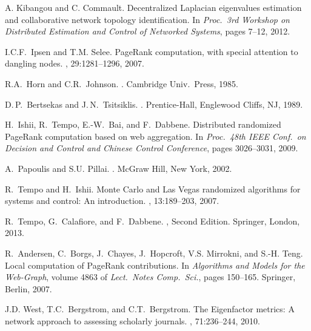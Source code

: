 \documentclass[11pt,draftcls,onecolumn]{IEEEtran}
\begin{document}
\begin{table}[t]
\begin{thebibliography}{1}
A. Kibangou and C. Commault.
\newblock Decentralized Laplacian eigenvalues estimation and collaborative 
network topology identification.
\newblock In {\em Proc.\ {\rm 3}rd Workshop on Distributed Estimation and 
Control of Networked Systems}, pages 7--12, 2012.

I.{\;}C.{\;}F.~Ipsen and T.{\;}M. Selee.
\newblock PageRank computation, with special attention to dangling nodes.
, 29:1281--1296, 2007.


R.{\;}A.\ Horn and C.{\;}R.\ Johnson.
.
\newblock Cambridge Univ.\ Press, 1985.

D.{\,}P.\ Bertsekas and J.{\,}N.\ Tsitsiklis.
.
\newblock Prentice-Hall, Englewood Cliffs, NJ, 1989.


H.~Ishii, R.~Tempo, E.-W.\ Bai, and F.~Dabbene.
\newblock Distributed randomized {P}age{R}ank computation based on web
  aggregation.
\newblock In {\em Proc.\ {\rm 48}th IEEE Conf.\ on Decision and Control and
  Chinese Control Conference}, pages 3026--3031, 2009.

A.~Papoulis and S.{\;}U. Pillai.
.
\newblock McGraw Hill, New York, 2002.

R.~Tempo and H.~Ishii.
\newblock Monte {C}arlo and {L}as {V}egas randomized algorithms for systems and
  control: {A}n introduction.
, 13:189--203, 2007.

R.~Tempo, G.~Calafiore, and F.~Dabbene.
, 
Second Edition.
\newblock Springer, London, 2013.

R.~Andersen, C.~Borgs, J.~Chayes, J.~Hopcroft, V.{\;}S. Mirrokni, and S.-H.
  Teng.
\newblock Local computation of {P}age{R}ank contributions.
\newblock In {\em Algorithms and Models for the Web-Graph}, volume 4863 of {\em
  Lect.\ Notes Comp.\ Sci.}, pages 150--165. Springer, Berlin, 2007.

J.{\;}D. West, T.{\;}C.~Bergstrom, and C.{\;}T.~Bergstrom.
\newblock The {E}igenfactor metrics:  {A} network approach to assessing scholarly journals.
, 71:236--244, 2010.


\end{thebibliography}
\end{table}
\end{document}
